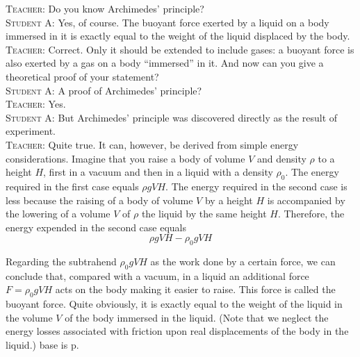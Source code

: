 \documentclass[a4paper,sfsidenotes]{tufte-book}
\begin{document}
\textsc{Teacher:} Do you know Archimedes' principle?
\\
\textsc{Student A:} Yes, of course. The buoyant force exerted by a liquid on a body immersed in it is
exactly equal to the weight of the liquid displaced by the body.
\\
\textsc{Teacher:} Correct. Only it should be extended to include gases: a buoyant force is also exerted by a gas on a body ``immersed'' in it. And now can you give a theoretical proof of your statement?
\\
\textsc{Student A:} A proof of Archimedes' principle?
\\
\textsc{Teacher:} Yes.
\\
\textsc{Student A:} But Archimedes' principle was discovered directly as the result of experiment.
\\
\textsc{Teacher:} Quite true. It can, however, be derived from simple energy considerations. Imagine that you raise a body of volume $V$ and density $\rho$ to a height $H$, first in a vacuum and then in a liquid with a density $\rho_{0}$. The energy required in the first case equals $\rho g V H $. The energy required in the second case is less because the raising of a body of volume $V$ by a height $H$ is accompanied by the lowering of a volume $V$ of $\rho$ the liquid by the same height $H$. Therefore, the energy expended in the second case equals 
\begin{equation*}%
\rho g V H - \rho_{0} g V H
\end{equation*}

Regarding the subtrahend $\rho_{0} g V H$ as the work done by a certain force, we can conclude that, compared with a vacuum, in a liquid an additional force $F=\rho_{0} g V H$ acts on the body making it easier to raise. This force is called the buoyant force. Quite obviously, it is exactly equal to the weight of the liquid in the volume $V$ of the body immersed in the liquid. (Note that we neglect the energy losses associated with friction upon real displacements of the body in the liquid.) base is p.
\end{document}
